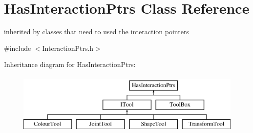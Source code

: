 \hypertarget{class_has_interaction_ptrs}{}\section{Has\+Interaction\+Ptrs Class Reference}
\label{class_has_interaction_ptrs}


inherited by classes that need to used the interaction pointers  




{\ttfamily \#include $<$Interaction\+Ptrs.\+h$>$}

Inheritance diagram for Has\+Interaction\+Ptrs\+:\begin{figure}[H]
\begin{center}
\leavevmode
\includegraphics[height=3.000000cm]{class_has_interaction_ptrs}
\end{center}
\end{figure}
